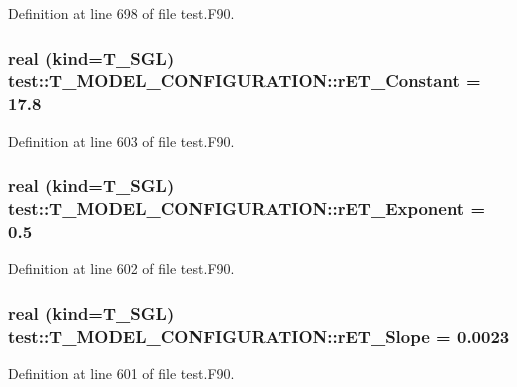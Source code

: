 Definition at line 698 of file test.F90.

\hypertarget{typetest_1_1_t___m_o_d_e_l___c_o_n_f_i_g_u_r_a_t_i_o_n_aca4de8d6735f39e9a7f04c423d71db3a}{
\subsubsection[{rET\_\-Constant}]{\setlength{\rightskip}{0pt plus 5cm}real (kind={\bf T\_\-SGL}) {\bf test::T\_\-MODEL\_\-CONFIGURATION::rET\_\-Constant} = 17.8}}
\label{typetest_1_1_t___m_o_d_e_l___c_o_n_f_i_g_u_r_a_t_i_o_n_aca4de8d6735f39e9a7f04c423d71db3a}


Definition at line 603 of file test.F90.

\hypertarget{typetest_1_1_t___m_o_d_e_l___c_o_n_f_i_g_u_r_a_t_i_o_n_af8bee30424a7860afebf85ea40ef1462}{
\subsubsection[{rET\_\-Exponent}]{\setlength{\rightskip}{0pt plus 5cm}real (kind={\bf T\_\-SGL}) {\bf test::T\_\-MODEL\_\-CONFIGURATION::rET\_\-Exponent} = 0.5}}
\label{typetest_1_1_t___m_o_d_e_l___c_o_n_f_i_g_u_r_a_t_i_o_n_af8bee30424a7860afebf85ea40ef1462}


Definition at line 602 of file test.F90.

\hypertarget{typetest_1_1_t___m_o_d_e_l___c_o_n_f_i_g_u_r_a_t_i_o_n_a40f661191ec8ef684a86c4f5c4eb1982}{
\subsubsection[{rET\_\-Slope}]{\setlength{\rightskip}{0pt plus 5cm}real (kind={\bf T\_\-SGL}) {\bf test::T\_\-MODEL\_\-CONFIGURATION::rET\_\-Slope} = 0.0023}}
\label{typetest_1_1_t___m_o_d_e_l___c_o_n_f_i_g_u_r_a_t_i_o_n_a40f661191ec8ef684a86c4f5c4eb1982}


Definition at line 601 of file test.F90.

